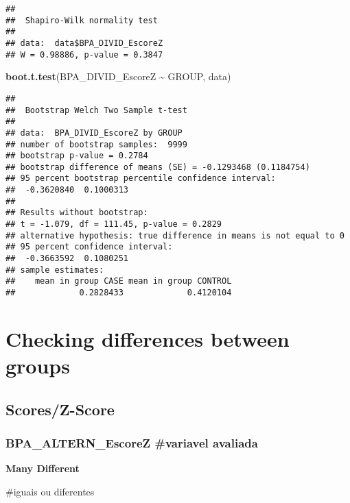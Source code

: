 \documentclass[
]{article}
\newenvironment{Shaded}{\begin{snugshade}}{\end{snugshade}}
\newcommand{\AttributeTok}[1]{\textcolor[rgb]{0.13,0.29,0.53}{#1}}
\newcommand{\DecValTok}[1]{\textcolor[rgb]{0.00,0.00,0.81}{#1}}
\newcommand{\FunctionTok}[1]{\textcolor[rgb]{0.13,0.29,0.53}{\textbf{#1}}}
\newcommand{\NormalTok}[1]{#1}
\newcommand{\SpecialCharTok}[1]{\textcolor[rgb]{0.81,0.36,0.00}{\textbf{#1}}}
\newcommand{\StringTok}[1]{\textcolor[rgb]{0.31,0.60,0.02}{#1}}
\begin{document}
\begin{verbatim}
## 
##  Shapiro-Wilk normality test
## 
## data:  data$BPA_DIVID_EscoreZ
## W = 0.98886, p-value = 0.3847
\end{verbatim}

\begin{Shaded}
\begin{Highlighting}[]
\FunctionTok{boot.t.test}\NormalTok{(BPA\_DIVID\_EscoreZ }\SpecialCharTok{\textasciitilde{}}\NormalTok{ GROUP, data)}
\end{Highlighting}
\end{Shaded}

\begin{verbatim}
## 
##  Bootstrap Welch Two Sample t-test
## 
## data:  BPA_DIVID_EscoreZ by GROUP
## number of bootstrap samples:  9999
## bootstrap p-value = 0.2784 
## bootstrap difference of means (SE) = -0.1293468 (0.1184754) 
## 95 percent bootstrap percentile confidence interval:
##  -0.3620840  0.1000313
## 
## Results without bootstrap:
## t = -1.079, df = 111.45, p-value = 0.2829
## alternative hypothesis: true difference in means is not equal to 0
## 95 percent confidence interval:
##  -0.3663592  0.1080251
## sample estimates:
##    mean in group CASE mean in group CONTROL 
##             0.2828433             0.4120104
\end{verbatim}

\section{\texorpdfstring{\textbf{Checking differences between
groups}}{Checking differences between groups}}\label{checking-differences-between-groups-2}

\subsection{\texorpdfstring{\textbf{Scores/Z-Score}}{Scores/Z-Score}}\label{scoresz-score-2}

\subsubsection{BPA\_ALTERN\_EscoreZ \#variavel
avaliada}\label{bpa_altern_escorez-variavel-avaliada}

\textbf{Many Different}

\#iguais ou diferentes

\begin{Shaded}
\end{Shaded}
\end{document}
